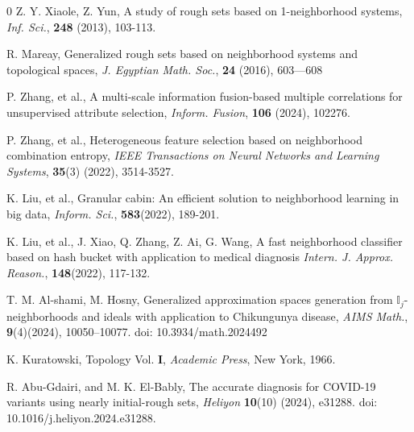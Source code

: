 \documentclass{article}
\theoremstyle{theorem}
\theoremstyle{definition}
\theoremstyle{remark}
\begin{document}
\begin{thebibliography}{0}
 Z. Y. Xiaole, Z. Yun, A study of rough sets based on 1-neighborhood systems, \emph{Inf. Sci.}, \textbf{248} (2013), 103-113.

 R. Mareay, Generalized rough sets based on neighborhood systems and topological spaces, \emph{J. Egyptian Math. Soc.}, \textbf{24} (2016), 603—608

  P. Zhang, et al., A multi-scale information fusion-based multiple correlations for unsupervised attribute selection, \emph{Inform. Fusion}, \textbf{106} (2024), 102276.

  P. Zhang, et al., Heterogeneous feature selection based on neighborhood combination entropy, \emph{IEEE Transactions on Neural Networks and Learning Systems}, \textbf{35}(3) (2022), 3514-3527.

  K. Liu, et al., Granular cabin: An efficient solution to neighborhood learning in big data, \emph{Inform. Sci.}, \textbf{583}(2022), 189-201.

  K. Liu, et al., J. Xiao, Q. Zhang, Z. Ai, G. Wang, A fast neighborhood classifier based on hash bucket with application to medical diagnosis \emph{Intern. J. Approx. Reason.}, \textbf{148}(2022), 117-132.

 T. M. Al-shami, M. Hosny, Generalized approximation spaces generation from $\mathbb{I}_{j}$-neighborhoods and ideals with application to Chikungunya disease, \emph{AIMS Math.},  \textbf{9}(4)(2024), 10050--10077. doi: 10.3934/math.2024492

 K. Kuratowski, Topology Vol. \textbf{I}, \emph{Academic Press}, New York, 1966.

 R. Abu-Gdairi, and M. K. El-Bably, The accurate diagnosis for COVID-19 variants using nearly initial-rough sets, \emph{Heliyon} \textbf{10}(10) (2024), e31288. doi: 10.1016/j.heliyon.2024.e31288.


\end{thebibliography}

 
\end{document}
